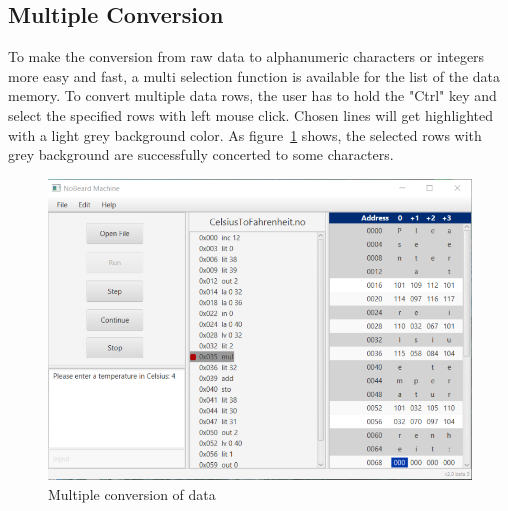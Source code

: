 \subsection{Multiple Conversion}
 To make the conversion from raw data to alphanumeric characters or integers more easy and fast, a multi selection function is available for the list of the data memory.
To convert multiple data rows, the user has to hold the "Ctrl" key and select the specified rows with  left mouse click. Chosen lines will get highlighted with a light grey background color. As figure~\ref{fig:multipleConversion} shows, the selected rows with grey background are successfully concerted to some characters.
\begin{figure}[h] 
	\centering
	\includegraphics[scale=.85]{images/screenshot-5.png}
	\caption{Multiple conversion of data}
	\label{fig:multipleConversion}
\end{figure}
